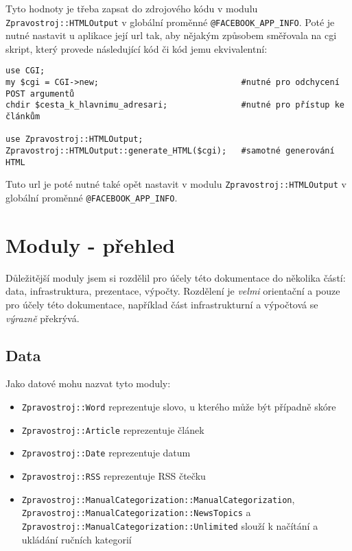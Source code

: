 \documentclass[12pt,a4paper]{report}
\begin{document}
Tyto hodnoty je třeba zapsat do zdrojového kódu v modulu \texttt{Zpravostroj::HTMLOutput} v globální proměnné \texttt{@FACEBOOK\_APP\_INFO}. Poté je nutné nastavit u aplikace její url tak, aby nějakým způsobem směřovala na cgi skript, který provede následující kód či kód jemu ekvivalentní:

\lstset{language=Perl, frame=single}
\begin{lstlisting}
use CGI;
my $cgi = CGI->new;                             #nutné pro odchycení POST argumentů
chdir $cesta_k_hlavnimu_adresari;               #nutné pro přístup ke článkům

use Zpravostroj::HTMLOutput;
Zpravostroj::HTMLOutput::generate_HTML($cgi);   #samotné generování HTML
\end{lstlisting}

Tuto url je poté nutné také opět nastavit v modulu \texttt{Zpravostroj::HTMLOutput} v globální proměnné \texttt{@FACEBOOK\_APP\_INFO}.


\chapter{Moduly - přehled}

Důležitější moduly jsem si rozdělil pro účely této dokumentace do několika částí: data, infrastruktura, prezentace, výpočty. Rozdělení je \emph{velmi} orientační a pouze pro účely této dokumentace, například část infrastrukturní a výpočtová se \emph{výrazně} překrývá.

\section{Data}
Jako datové mohu nazvat tyto moduly:

\begin{itemize}
	\item \texttt{Zpravostroj::Word} reprezentuje slovo, u kterého může být případně skóre
	\item \texttt{Zpravostroj::Article} reprezentuje článek
	\item \texttt{Zpravostroj::Date} reprezentuje datum
	\item \texttt{Zpravostroj::RSS} reprezentuje RSS čtečku
	\item \texttt{Zpravostroj::ManualCategorization::ManualCategorization}, \texttt{Zpravostroj::ManualCategorization::NewsTopics} a \texttt{Zpravostroj::ManualCategorization::Unlimited} slouží k načítání a ukládání ručních kategorií
	
\end{itemize}	
\end{document}
